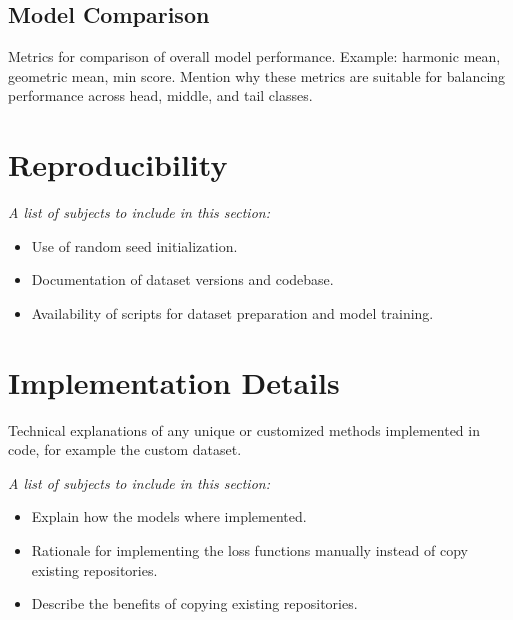 \subsection{Model Comparison}
Metrics for comparison of overall model performance. Example: harmonic mean, geometric mean, min score. Mention why these metrics are suitable for balancing performance across head, middle, and tail classes.

\section{Reproducibility}
\textit{A list of subjects to include in this section:}

\begin{itemize}
    \item Use of random seed initialization.
    \item Documentation of dataset versions and codebase.
    \item Availability of scripts for dataset preparation and model training.
\end{itemize}

\section{Implementation Details}
Technical explanations of any unique or customized methods implemented in code, for example the custom dataset.

\textit{A list of subjects to include in this section:}

\begin{itemize}
    \item Explain how the models where implemented.
    \item Rationale for implementing the loss functions manually instead of copy existing repositories.
    \item Describe the benefits of copying existing repositories.
\end{itemize}


